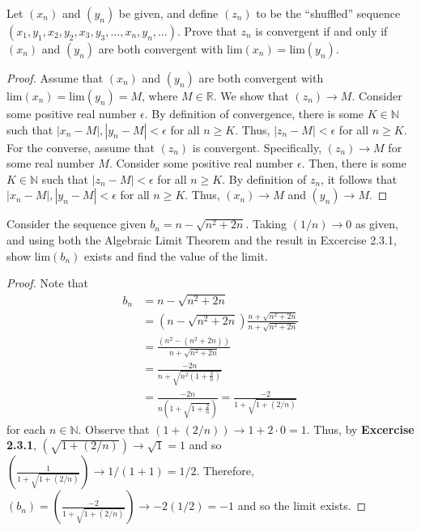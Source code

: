 \documentclass[12pt]{article}
\newcommand{\N}{\mathbb{N}}
\newcommand{\R}{\mathbb{R}}
\newcommand{\Lim}[1]{\mathrm{lim}\left( #1\right)}
\newenvironment{problem}[2][Problem]{\begin{trivlist} \item[\hskip \labelsep {\bfseries #1}\hskip \labelsep {\bfseries #2.}]}{\end{trivlist}}
\begin{document}
    \begin{problem}{2.3.5}
      Let $(x_{n})$ and $(y_{n})$ be given, and define $(z_{n})$ to be the ``shuffled'' sequence $(x_{1},y_{1},x_{2},y_{2},x_{3},y_{3},\dots,x_{n},y_{n},\dots)$. Prove that $z_{n}$ is convergent if and only if $(x_{n})$ and $(y_{n})$ are both convergent with $\Lim{x_{n}} = \Lim{y_{n}}$.
    \begin{proof}
      Assume that $(x_{n})$ and $(y_{n})$ are both convergent with $\Lim{x_{n}} = \Lim{y_{n}}=M$, where $M \in \R$. We show that $(z_{n}) \to M$. Consider some positive real number $\epsilon$. By definition of convergence, there is some $K\in \N$ such that $|x_{n}-M|,|y_{n}-M|<\epsilon$ for all $n\geq K$. Thus, $|z_{n} - M| < \epsilon$ for all $n\geq K$.\\
      For the converse, assume that $(z_{n})$ is convergent. Specifically, $(z_{n}) \to M$ for some real number $M$. Consider some positive real number $\epsilon$. Then, there is some $K\in \N$ such that $|z_{n} -M| < \epsilon$ for all $n\geq K$. By definition of $z_{n}$, it follows that $|x_{n} -M|,|y_{n}-M| < \epsilon$ for all $n\geq K$. Thus, $(x_{n})\to M$ and $(y_{n})\to M$.
    \end{proof}
    \end{problem}
    \begin{problem}{2.3.6}
      Consider the sequence given $b_{n} = n-\sqrt{n^{2}+2n}$. Taking $(1/n)\to 0$ as given, and using both the Algebraic Limit Theorem and the result in Excercise 2.3.1, show $\Lim{b_{n}}$ exists and find the value of the limit.
    \begin{proof}
      Note that
    \begin{align*}
      b_{n} &= n-\sqrt{n^{2}+2n}\\
      &= \left( n-\sqrt{n^{2}+2n} \right)\frac{n+\sqrt{n^{2}+2n}}{n+\sqrt{n^{2}+2n}}\\
      &= \frac{\left( n^{2}-\left(n^{2}+2n\right) \right)}{n+\sqrt{n^{2}+2n}}\\
      &= \frac{-2n}{n+\sqrt{n^{2}\left( 1+\frac{2}{n} \right)}}\\
      &= \frac{-2n}{n\left( 1+\sqrt{1+\frac{2}{n}} \right)} = \frac{-2}{1+\sqrt{1+(2/n)}}
    \end{align*}
    for each $n\in \N$. Observe that $\left( 1+(2/n) \right)\to 1+2\cdot 0 = 1$. Thus, by \textbf{Excercise 2.3.1}, $\left( \sqrt{1+(2/n)} \right) \to \sqrt{1} = 1$ and so $\left( \frac{1}{1+\sqrt{1+(2/n)}} \right) \to 1/(1+1) =1/2$. Therefore, $(b_{n}) = \left(\frac{-2}{1+\sqrt{1+(2/n)}}\right)\to  -2(1/2) = -1$ and so the limit exists.
    \end{proof}
    \end{problem}
\end{document}
